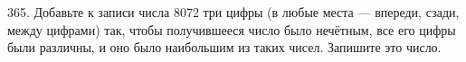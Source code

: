 365. Добавьте к записи числа 8072 три цифры (в любые места --- впереди, сзади, между цифрами) так, чтобы получившееся число было нечётным, все его цифры были различны, и оно было наибольшим из таких чисел. Запишите это число.\\

